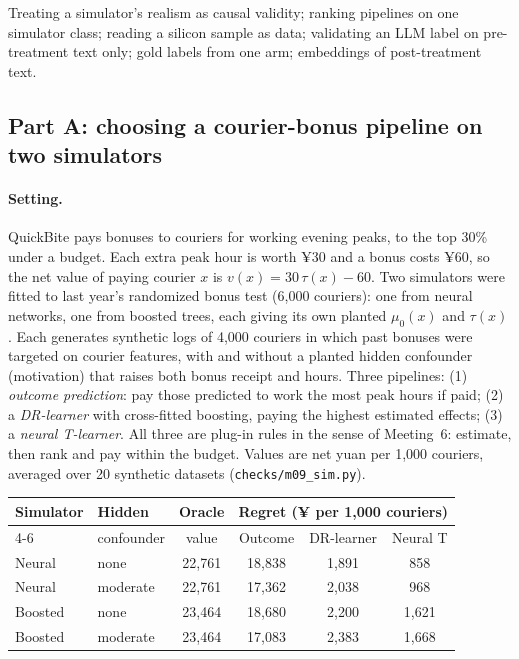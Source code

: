 \documentclass[11pt]{article}
\begin{document}
\begin{pitfall}
Treating a simulator's realism as causal validity; ranking pipelines on one simulator class; reading a silicon sample as data; validating an
LLM label on pre-treatment text only; gold labels from one arm; embeddings of post-treatment text.
\end{pitfall}

\sectiontwo

\subsection*{Part A: choosing a courier-bonus pipeline on two simulators}

\paragraph{Setting.} QuickBite pays bonuses to couriers for working evening peaks, to the top 30\% under a budget. Each extra peak hour is worth
¥30 and a bonus costs ¥60, so the net value of paying courier $x$ is $v(x) = 30\,\tau(x) - 60$. Two simulators were fitted to last year's
randomized bonus test (6{,}000 couriers): one from neural networks, one from boosted trees, each giving its own planted $\mu_0(x)$ and $\tau(x)$.
Each generates synthetic logs of 4{,}000 couriers in which past bonuses were targeted on courier features, with and without a planted hidden
confounder (motivation) that raises both bonus receipt and hours. Three pipelines: (1) \emph{outcome prediction}: pay those predicted to work
the most peak hours if paid; (2) a \emph{DR-learner} with cross-fitted boosting, paying the highest estimated effects; (3) a \emph{neural
T-learner}. All three are plug-in rules in the sense of Meeting~6: estimate, then rank and pay within the budget. Values are net yuan per 1{,}000 couriers, averaged over 20 synthetic datasets (\texttt{checks/m09\_sim.py}).
\begin{center}
\begin{tabular}{llcccc}
\toprule
Simulator & Hidden & Oracle & \multicolumn{3}{c}{Regret (¥ per 1{,}000 couriers)} \\
\cmidrule(lr){4-6}
 & confounder & value & Outcome & DR-learner & Neural T \\
\midrule
Neural  & none     & 22{,}761 & 18{,}838 & 1{,}891 & 858 \\
Neural  & moderate & 22{,}761 & 17{,}362 & 2{,}038 & 968 \\
Boosted & none     & 23{,}464 & 18{,}680 & 2{,}200 & 1{,}621 \\
Boosted & moderate & 23{,}464 & 17{,}083 & 2{,}383 & 1{,}668 \\
\bottomrule
\end{tabular}
\end{center}
\end{document}

